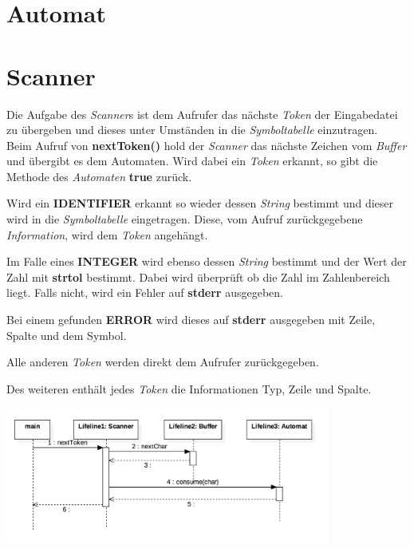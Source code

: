 \documentclass[
    a4paper
]{scrreprt}
\begin{document}
    
    \section{Automat}
    
    
    \section{Scanner}
    Die Aufgabe des \textit{Scanner}s ist dem Aufrufer das nächste \textit{Token} der Eingabedatei zu übergeben und dieses unter Umständen in die \textit{Symboltabelle} einzutragen.\\
    
    Beim Aufruf von \textbf{nextToken()} hold der \textit{Scanner} das nächste Zeichen vom \textit{Buffer} und übergibt es dem Automaten. Wird dabei ein \textit{Token} erkannt, so gibt die Methode des \textit{Automaten} \textbf{true} zurück.

	Wird ein \textbf{IDENTIFIER} erkannt so wieder dessen \textit{String} bestimmt und dieser wird in die \textit{Symboltabelle} eingetragen. Diese, vom Aufruf zurückgegebene \textit{Information}, wird dem \textit{Token} angehängt.
	
	Im Falle eines \textbf{INTEGER} wird ebenso dessen \textit{String} bestimmt und der Wert der Zahl mit \textbf{strtol} bestimmt. Dabei wird überprüft ob die Zahl im Zahlenbereich liegt. Falls nicht, wird ein Fehler auf \textbf{stderr} ausgegeben.
	
	Bei einem gefunden \textbf{ERROR} wird dieses auf \textbf{stderr} ausgegeben mit Zeile, Spalte und dem Symbol.
	
	Alle anderen \textit{Token} werden direkt dem Aufrufer zurückgegeben. 
	
	Des weiteren enthält jedes \textit{Token} die Informationen Typ, Zeile und Spalte.
	
	\begin{center}
		\includegraphics[width=0.8\textwidth]{./images/scanner_sequence.png}
	\end{center}
\end{document}
